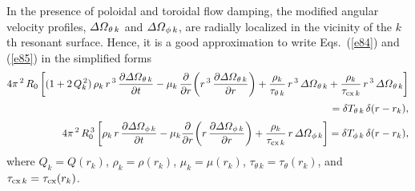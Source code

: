 \documentclass[notitlepage,12pt]{article}
\begin{document}
In the presence of poloidal and toroidal flow damping, the
modified angular velocity profiles,  ${\mit\Delta\Omega}_{\theta\,k}$ and 
${\mit\Delta\Omega}_{\phi\,k}$,  are radially localized in the
vicinity of the $k$th resonant surface. Hence, it is a
good approximation to write Eqs.~(\ref{e84}) and (\ref{e85}) in the simplified forms 
\begin{align}
 4\pi^{\,2}\,R_0\left[(1+2\,Q_k^{\,2})\,\rho_k\,r^{\,3}\,\frac{\partial{\mit\Delta\Omega}_{\theta\,k}}{\partial t}-\mu_k\,\frac{\partial}{\partial r}\!\left(
r^{\,3}\,\frac{\partial{\mit\Delta\Omega}_{\theta\,k}}{\partial r}\right) +\frac{\rho_k}{\tau_{\theta\,k}}\,r^{\,3}\,{\mit\Delta\Omega}_{\theta\,k}
+\frac{\rho_k}{\tau_{{\rm cx}\,k}}\,r^{\,3}\,{\mit\Delta\Omega}_{\theta\,k}\right]\nonumber\\[0.5ex]\phantom{==}=\delta T_{\theta\,k}\,\delta (r-r_k),\\[0.5ex]
 4\pi^{\,2}\,R_0^{\,3}\left[\rho_k\,r\,\frac{\partial{\mit\Delta\Omega}_{\phi\,k}}{\partial t}-\mu_k\frac{\partial}{\partial r}\!\left(
r\,\frac{\partial{\mit\Delta\Omega}_{\phi\,k}}{\partial r}\right) +\frac{\rho_k}{\tau_{{\rm cx}\,k}}\,r\,{\mit\Delta\Omega}_{\phi\,k}\right]
= \delta T_{\phi\,k}\,\delta(r-r_k),
\end{align}
where $Q_k = Q(r_k)$, $\rho_k=\rho(r_k)$, $\mu_k=\mu(r_k)$, $\tau_{\theta\,k}=\tau_\theta(r_k)$, and $\tau_{{\rm cx}\,k}=\tau_{\rm cx}(r_k)$. 
\end{document}
